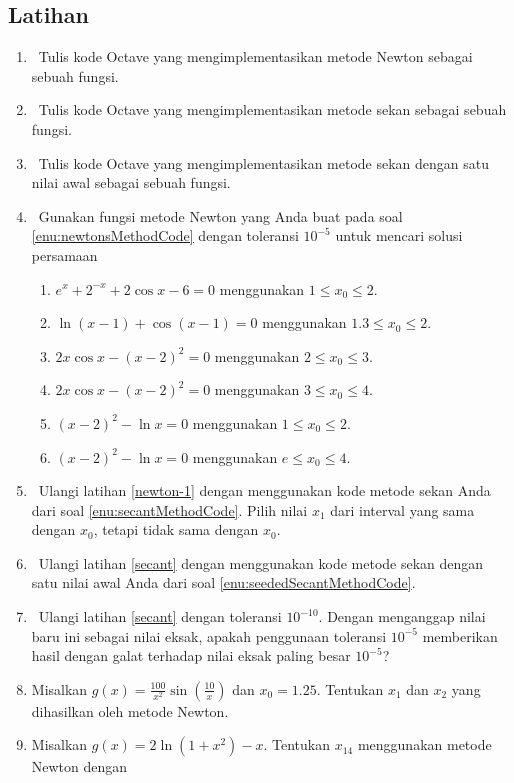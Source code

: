 \subsection{Latihan}
\begin{enumerate}
\item \octave\ \label{enu:newtonsMethodCode}Tulis kode Octave yang mengimplementasikan
metode Newton sebagai sebuah fungsi.
\item \octave\ \label{enu:secantMethodCode}Tulis kode Octave yang mengimplementasikan
metode sekan sebagai sebuah fungsi.
\item \octave\ \label{enu:seededSecantMethodCode}Tulis kode Octave yang
mengimplementasikan metode sekan dengan satu nilai awal sebagai sebuah
fungsi.
\item \octave\ \label{newton-1}Gunakan fungsi metode Newton yang Anda
buat pada soal \ref{enu:newtonsMethodCode} dengan toleransi $10^{-5}$
untuk mencari solusi persamaan

\begin{enumerate}
\item $e^{x}+2^{-x}+2\cos x-6=0$ menggunakan $1\leq x_{0}\leq2$.
\item $\ln(x-1)+\cos(x-1)=0$ menggunakan $1.3\leq x_{0}\leq2$.
\item $2x\cos x-(x-2)^{2}=0$ menggunakan $2\leq x_{0}\leq3$. \hasananswer 
\item $2x\cos x-(x-2)^{2}=0$ menggunakan $3\leq x_{0}\leq4$. \hasananswer 
\item $(x-2)^{2}-\ln x=0$ menggunakan $1\leq x_{0}\leq2$.
\item $(x-2)^{2}-\ln x=0$ menggunakan $e\leq x_{0}\leq4$.
\end{enumerate}
\item \octave\ \label{secant}Ulangi latihan \ref{newton-1} dengan menggunakan
kode metode sekan Anda dari soal \ref{enu:secantMethodCode}. Pilih
nilai $x_{1}$ dari interval yang sama dengan $x_{0}$, tetapi tidak
sama dengan $x_{0}$. \haspartwithanswer 
\item \octave\ \label{exc:newton}Ulangi latihan \ref{secant} dengan menggunakan
kode metode sekan dengan satu nilai awal Anda dari soal \ref{enu:seededSecantMethodCode}. \haspartwithanswer 
\item \octave\ \label{exc:newton-1}Ulangi latihan \ref{secant} dengan
toleransi $10^{-10}$. Dengan menganggap nilai baru ini sebagai nilai
eksak, apakah penggunaan toleransi $10^{-5}$ memberikan hasil dengan
galat terhadap nilai eksak paling besar $10^{-5}$?  \haspartwithanswer 
\item \label{exc:newton-2}Misalkan $g(x)=\frac{100}{x^{2}}\sin\left(\frac{10}{x}\right)$
dan $x_{0}=1.25$. Tentukan $x_{1}$ dan $x_{2}$ yang dihasilkan
oleh metode Newton. \hasasolution 
\item \label{newton1}Misalkan $g(x)=2\ln(1+x^{2})-x$. Tentukan $x_{14}$
menggunakan metode Newton dengan


\end{enumerate}
